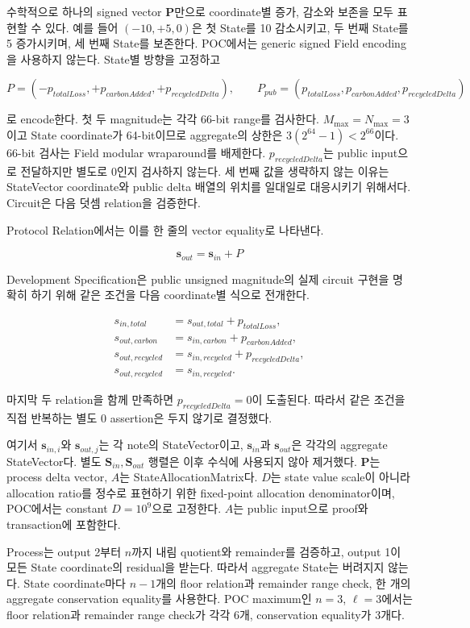 \documentclass[11pt]{extarticle}
\begin{document}
수학적으로 하나의 signed vector $\mathbf{P}$만으로 coordinate별 증가, 감소와 보존을
모두 표현할 수 있다. 예를 들어 $(-10,+5,0)$은 첫 State를 10 감소시키고,
두 번째 State를 5 증가시키며, 세 번째 State를 보존한다. POC에서는 generic signed
Field encoding을 사용하지 않는다. State별 방향을 고정하고

\[
P=(-p_{totalLoss},+p_{carbonAdded},+p_{recycledDelta}),
\qquad
P_{pub}=(p_{totalLoss},p_{carbonAdded},p_{recycledDelta})
\]

로 encode한다. 첫 두 magnitude는 각각 66-bit range를 검사한다.
$M_{\max}=N_{\max}=3$이고 State coordinate가 64-bit이므로 aggregate의 상한은
$3(2^{64}-1)<2^{66}$이다. 66-bit 검사는 Field modular wraparound를 배제한다.
$p_{recycledDelta}$는 public input으로 전달하지만 별도로 0인지 검사하지 않는다. 세 번째 값을
생략하지 않는 이유는 StateVector coordinate와 public delta 배열의 위치를 일대일로
대응시키기 위해서다. Circuit은 다음 덧셈 relation을 검증한다.

Protocol Relation에서는 이를 한 줄의 vector equality로 나타낸다.

\[
\mathbf{s}_{out}=\mathbf{s}_{in}+P
\]

Development Specification은 public unsigned magnitude의 실제 circuit 구현을 명확히 하기
위해 같은 조건을 다음 coordinate별 식으로 전개한다.

\[
\begin{aligned}
s_{in,total}&=s_{out,total}+p_{totalLoss},\\
s_{out,carbon}&=s_{in,carbon}+p_{carbonAdded},\\
s_{out,recycled}&=s_{in,recycled}+p_{recycledDelta},\\
s_{out,recycled}&=s_{in,recycled}.
\end{aligned}
\]

마지막 두 relation을 함께 만족하면 $p_{recycledDelta}=0$이 도출된다. 따라서 같은
조건을 직접 반복하는 별도 0 assertion은 두지 않기로 결정했다.

여기서 $\mathbf{s}_{in,i}$와 $\mathbf{s}_{out,j}$는 각 note의 StateVector이고,
$\mathbf{s}_{in}$과 $\mathbf{s}_{out}$은 각각의 aggregate StateVector다.
별도 $\mathbf{S}_{in},\mathbf{S}_{out}$ 행렬은 이후 수식에 사용되지 않아 제거했다.
$\mathbf{P}$는 process delta vector, $A$는 StateAllocationMatrix다.
$D$는 state value scale이 아니라 allocation ratio를 정수로 표현하기
위한 fixed-point allocation denominator이며, POC에서는 constant $D=10^9$으로 고정한다.
$A$는 public input으로 proof와 transaction에 포함한다.

Process는 output 2부터 $n$까지 내림 quotient와 remainder를 검증하고,
output 1이 모든 State coordinate의 residual을 받는다. 따라서 aggregate State는
버려지지 않는다. State coordinate마다 $n-1$개의 floor relation과 remainder
range check, 한 개의 aggregate conservation equality를 사용한다. POC maximum인
$n=3$, $\ell=3$에서는 floor relation과 remainder range check가 각각 6개,
conservation equality가 3개다.
\end{document}
